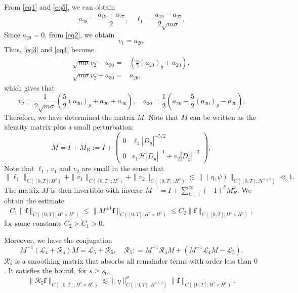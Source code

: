 \documentclass[12pt]{amsart}
\theoremstyle{remark}
\theoremstyle{definition}
\numberwithin{equation}{section}
\renewcommand{\H}{{\mathcal H }}
\newcommand{\f}{\frac}
\newcommand{\mH}{\mathcal{H}}
\newcommand{\mL}{\mathcal{L}}
\newcommand{\mR}{\mathcal{R}}
\newcommand{\inv}{^{-1}}
\begin{document}
From \eqref{eq1} and \eqref{eq5}, we can obtain
\begin{equation}
a_{28}=\f{a_{19}+a_{27}}{2},\quad \ell_1=\f{a_{19}-a_{27}}{2\sqrt{m\sigma}}.
\end{equation}
Since $a_{29}=0$, from \eqref{eq2}, we obtain
\begin{equation}
v_1=a_{20}.
\end{equation}
Thus, \eqref{eq3} and \eqref{eq4} become
\begin{align*}
\sqrt{m\sigma}v_2 - a_{30}=&\left(\f52(a_{20})_y + a_{20} \right),\\
\sqrt{m\sigma}v_2+a_{30}=&a_{26},
\end{align*}
which gives that
\begin{equation}
v_2=\f1{2\sqrt{m\sigma}}\left(\f52(a_{20})_y +a_{20}+a_{26}\right),\quad a_{30}=\f12\left(a_{26}-\f52(a_{20})_y -a_{20}\right).
\end{equation}
Therefore, we have determined the matrix $M$. 
Note that $M$ can be written as the identity matrix plus a small perturbation:
\begin{equation*}
    M = I + M_R := I +  \begin{pmatrix} 
0 &  \ell_1  |D_y|^{-5/2} \\ 
0 & v_1 \mH |D_y|^{-1}+  v_2 |D_y|^{-2} \end{pmatrix},
\end{equation*}
Note that $\ell_1$, $v_1$ and $v_2$ are small in the sense that 
\begin{equation*}
 \| \ell_1\|_{C([0,T]; H^s)} + \| v_1\|_{C([0,T]; H^s)} + \| v_2\|_{C([0,T]; H^s)} \lesssim \|(\eta, \psi) \|_{C([0,T]; \H^{s+2})} \ll 1.
\end{equation*}
The matrix $M$ is then invertible with inverse $M^{-1} = I + \sum_{k=1}^\infty (-1)^k M_R^k$.
We obtain the estimate
\begin{equation} \label{MpmBound}
   C_1 \| \mathbf{f}\|_{C([0,T]; H^s\times H^s)} \leq \|M^{\pm 1} \mathbf{f}\|_{C([0,T]; H^s\times H^s)} \leq C_2\| \mathbf{f}\|_{C([0,T]; H^s\times H^s)},
\end{equation}
for some constants $C_2>C_1 >0$.

Moreover, we have the conjugation
\begin{equation} \label{SLFourConjugation}
M\inv (\mL_4 + \mR_4) M
= \mL_5 + \mR_5, \quad \mR_5 : =  M\inv \mR_4 M + (M\inv \mL_4  M - \mL_5).
\end{equation}
 $\mR_5$ is a smoothing matrix that absorbs all remainder terms with order less than $0$.
It satisfies the bound, for $s \geq s_0$,
\begin{equation*}
\|\mR_5 \mathbf{f} \|_{C([0,T];H^{s}\times H^s)} \lesssim \|\eta\|^\theta_{C([0,T];H^{s+4})} \|\mathbf{f}\|_{C([0,T];H^{s}\times H^s)}.
\end{equation*}
\end{document}

